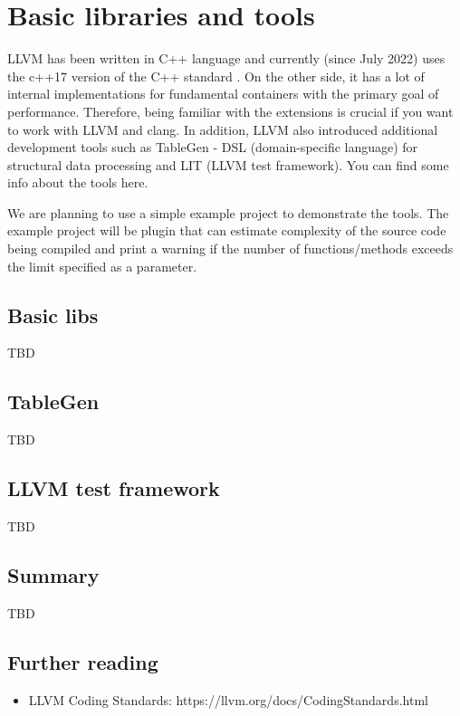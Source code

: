 \chapter{Basic libraries and tools}
\pagestyle{fancy}
\fancyhf{}
\rhead{\thepage}
LLVM has been written in C++ language and currently (since July 2022) uses the
c++17 version of the C++ standard \citep{llvm:cpp17migration}. On the other side,
it has a lot of internal implementations for fundamental containers with the
primary goal of performance. Therefore, being familiar with the extensions is
crucial if you want to work with LLVM and clang. In addition, LLVM also
introduced additional development tools such as TableGen - DSL (domain-specific
language) for structural data processing and LIT (LLVM test framework). You can
find some info about the tools here. 

We are planning to use a simple example project to demonstrate the tools. The
example project will be \clang plugin that can estimate complexity of
the source code being compiled and print a warning if the number of
functions/methods exceeds the limit specified as a parameter.  

\section{Basic libs}
TBD

\section{TableGen}
TBD

\section{LLVM test framework}
\label{sec:LLVMTest}
TBD

\section{Summary}
TBD

\section{Further reading}
\begin{itemize}
\item LLVM Coding Standards: https://llvm.org/docs/CodingStandards.html \citep{llvm:coding_standards}
\end{itemize}

